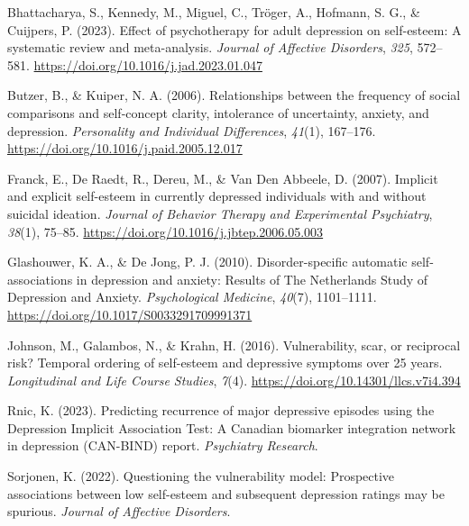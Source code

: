 \documentclass[
  man,
  floatsintext,
  longtable,
  nolmodern,
  notxfonts,
  notimes,
  colorlinks=true,linkcolor=blue,citecolor=blue,urlcolor=blue]{apa7}
\newlength{\cslhangindent}
\newenvironment{CSLReferences}[2] %
 {\begin{list}{}{%
  \setlength{\itemindent}{0pt}
  \setlength{\leftmargin}{0pt}
  \setlength{\parsep}{0pt}
  \ifodd #1
   \setlength{\leftmargin}{\cslhangindent}
   \setlength{\itemindent}{-1\cslhangindent}
  \fi
  \setlength{\itemsep}{#2\baselineskip}}}
 {\end{list}}
\begin{document}
\label{refs}
\begin{CSLReferences}{1}{0}
Bhattacharya, S., Kennedy, M., Miguel, C., Tröger, A., Hofmann, S. G.,
\& Cuijpers, P. (2023). Effect of psychotherapy for adult depression on
self-esteem: {A} systematic review and meta-analysis. \emph{Journal of
Affective Disorders}, \emph{325}, 572--581.
\url{https://doi.org/10.1016/j.jad.2023.01.047}

Butzer, B., \& Kuiper, N. A. (2006). Relationships between the frequency
of social comparisons and self-concept clarity, intolerance of
uncertainty, anxiety, and depression. \emph{Personality and Individual
Differences}, \emph{41}(1), 167--176.
\url{https://doi.org/10.1016/j.paid.2005.12.017}

Franck, E., De Raedt, R., Dereu, M., \& Van Den Abbeele, D. (2007).
Implicit and explicit self-esteem in currently depressed individuals
with and without suicidal ideation. \emph{Journal of Behavior Therapy
and Experimental Psychiatry}, \emph{38}(1), 75--85.
\url{https://doi.org/10.1016/j.jbtep.2006.05.003}

Glashouwer, K. A., \& De Jong, P. J. (2010). Disorder-specific automatic
self-associations in depression and anxiety: Results of {The}
{Netherlands} {Study} of {Depression} and {Anxiety}. \emph{Psychological
Medicine}, \emph{40}(7), 1101--1111.
\url{https://doi.org/10.1017/S0033291709991371}

Johnson, M., Galambos, N., \& Krahn, H. (2016). Vulnerability, scar, or
reciprocal risk? {Temporal} ordering of self-esteem and depressive
symptoms over 25 years. \emph{Longitudinal and Life Course Studies},
\emph{7}(4). \url{https://doi.org/10.14301/llcs.v7i4.394}

Rnic, K. (2023). Predicting recurrence of major depressive episodes
using the {Depression} {Implicit} {Association} {Test}: {A} {Canadian}
biomarker integration network in depression ({CAN}-{BIND}) report.
\emph{Psychiatry Research}.

Sorjonen, K. (2022). Questioning the vulnerability model: {Prospective}
associations between low self-esteem and subsequent depression ratings
may be spurious. \emph{Journal of Affective Disorders}.


\end{CSLReferences}
\end{document}
